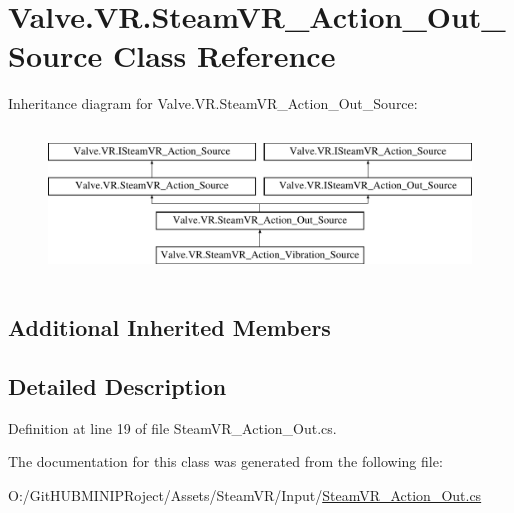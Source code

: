 \hypertarget{class_valve_1_1_v_r_1_1_steam_v_r___action___out___source}{}\section{Valve.\+V\+R.\+Steam\+V\+R\+\_\+\+Action\+\_\+\+Out\+\_\+\+Source Class Reference}
\label{class_valve_1_1_v_r_1_1_steam_v_r___action___out___source}
Inheritance diagram for Valve.\+V\+R.\+Steam\+V\+R\+\_\+\+Action\+\_\+\+Out\+\_\+\+Source\+:\begin{figure}[H]
\begin{center}
\leavevmode
\includegraphics[height=4.000000cm]{class_valve_1_1_v_r_1_1_steam_v_r___action___out___source}
\end{center}
\end{figure}
\subsection*{Additional Inherited Members}


\subsection{Detailed Description}


Definition at line 19 of file Steam\+V\+R\+\_\+\+Action\+\_\+\+Out.\+cs.



The documentation for this class was generated from the following file\+:\begin{DoxyCompactItemize}
\item 
O\+:/\+Git\+H\+U\+B\+M\+I\+N\+I\+P\+Roject/\+Assets/\+Steam\+V\+R/\+Input/\mbox{\hyperlink{_steam_v_r___action___out_8cs}{Steam\+V\+R\+\_\+\+Action\+\_\+\+Out.\+cs}}\end{DoxyCompactItemize}
